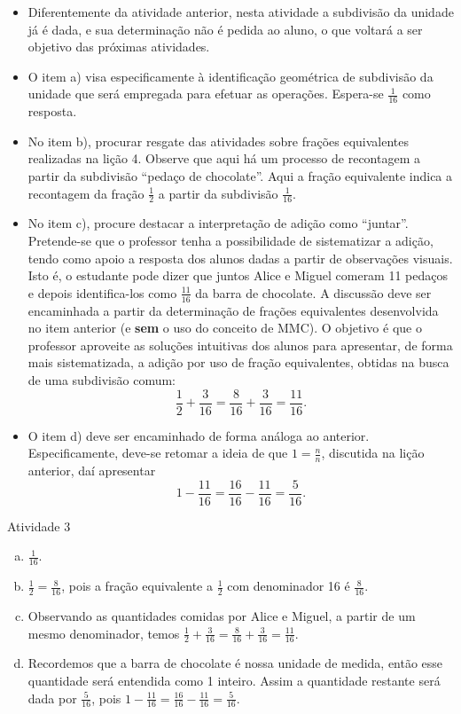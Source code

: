\begin{multicols}{2}
 \vspace{.15cm}

\begin{itemize} %
  \item      Diferentemente da atividade anterior, nesta atividade a subdivisão da unidade já é dada, e sua determinação não é pedida ao aluno, o que voltará a ser objetivo das próximas atividades.
  \item      O item a) visa especificamente à identificação geométrica de subdivisão da unidade que será empregada para efetuar as operações. Espera-se     $\frac{1}{16}$     como resposta.
  \item     No item b), procurar resgate das atividades sobre frações equivalentes realizadas na lição 4. Observe que aqui há um processo de recontagem a partir da subdivisão ``pedaço de chocolate''. Aqui a fração equivalente indica a recontagem da fração $\frac{1}{2}$ a partir da subdivisão $\frac{1}{16}$.
  \item  No item c), procure destacar a interpretação de adição como ``juntar''. Pretende-se que o professor tenha a possibilidade de sistematizar a adição, tendo como apoio a resposta dos alunos dadas a partir de observações visuais. Isto é, o estudante pode dizer que juntos Alice e Miguel comeram 11 pedaços e depois identifica-los como $\frac{11}{16}$ da barra de chocolate. A discussão deve ser encaminhada a partir da determinação de frações equivalentes desenvolvida no item anterior (e {\bf sem} o uso do conceito de MMC). O objetivo é que o professor aproveite as soluções intuitivas dos alunos para apresentar, de forma mais sistematizada, a adição por uso de fração equivalentes, obtidas na busca de uma subdivisão comum:
$$\frac{1}{2} + \frac{3}{16} = \frac{8}{16} + \frac{3}{16} = \frac{11}{16}.$$
  \item  O item d) deve ser encaminhado de forma análoga ao anterior. Especificamente, deve-se retomar a ideia de que $1 = \frac{n}{n}$, discutida na lição anterior, daí apresentar $$1 - \frac{11}{16} =  \frac{16}{16} - \frac{11}{16} = \frac{5}{16}.$$ 
\end{itemize} %

  \begin{resposta*}{Atividade 3}
    \begin{enumerate}[a)]
     \item $\frac{1}{16}$.
     \item $\frac{1}{2}=\frac{8}{16}$, pois a fração equivalente a $\frac{1}{2}$ com denominador 16 é $\frac{8}{16}$. 
     \item Observando as quantidades comidas por Alice e Miguel, a partir de um mesmo denominador, temos $\frac{1}{2}+\frac{3}{16} = \frac{8}{16} + \frac{3}{16} = \frac{11}{16}$. 
     \item Recordemos que a barra de chocolate é nossa unidade de medida, então esse quantidade será entendida como 1 inteiro. Assim a quantidade restante será dada por $\frac{5}{16}$, pois $1 - \frac{11}{16} = \frac{16}{16} - \frac{11}{16} = \frac{5}{16}$.
    \end{enumerate}
  \end{resposta*}


\end{multicols}
